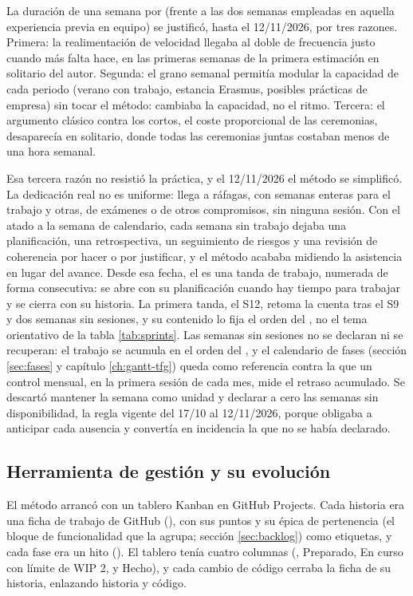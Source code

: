 La duración de una semana por  (frente a las dos semanas empleadas en aquella experiencia previa en equipo) se justificó, hasta el 12/11/2026, por tres razones.
Primera: la realimentación de velocidad llegaba al doble de frecuencia justo cuando más falta hace, en las primeras semanas de la primera estimación en solitario del autor.
Segunda: el grano semanal permitía modular la capacidad de cada periodo (verano con trabajo, estancia Erasmus, posibles prácticas de empresa) sin tocar el método: cambiaba la capacidad, no el ritmo.
Tercera: el argumento clásico contra los  cortos, el coste proporcional de las ceremonias, desaparecía en solitario, donde todas las ceremonias juntas costaban menos de una hora semanal.

Esa tercera razón no resistió la práctica, y el 12/11/2026 el método se simplificó.
La dedicación real no es uniforme: llega a ráfagas, con semanas enteras para el trabajo y otras, de exámenes o de otros compromisos, sin ninguna sesión.
Con el  atado a la semana de calendario, cada semana sin trabajo dejaba una planificación, una retrospectiva, un seguimiento de riesgos y una revisión de coherencia por hacer o por justificar, y el método acababa midiendo la asistencia en lugar del avance.
Desde esa fecha, el  es una tanda de trabajo, numerada de forma consecutiva: se abre con su planificación cuando hay tiempo para trabajar y se cierra con su historia.
La primera tanda, el S12, retoma la cuenta tras el S9 y dos semanas sin sesiones, y su contenido lo fija el orden del , no el tema orientativo de la tabla \ref{tab:sprints}.
Las semanas sin sesiones no se declaran ni se recuperan: el trabajo se acumula en el orden del , y el calendario de fases (sección \ref{sec:fases} y capítulo \ref{ch:gantt-tfg}) queda como referencia contra la que un control mensual, en la primera sesión de cada mes, mide el retraso acumulado.
Se descartó mantener la semana como unidad y declarar a cero las semanas sin disponibilidad, la regla vigente del 17/10 al 12/11/2026, porque obligaba a anticipar cada ausencia y convertía en incidencia la que no se había declarado.

\subsection{Herramienta de gestión y su evolución}
\label{sec:metodologia-herramienta}

El método arrancó con un tablero Kanban en GitHub Projects.
Cada historia era una ficha de trabajo de GitHub (), con sus puntos y su épica de pertenencia (el bloque de funcionalidad que la agrupa; sección \ref{sec:backlog}) como etiquetas, y cada fase era un hito ().
El tablero tenía cuatro columnas (, Preparado, En curso con límite de \acs{WIP} 2, y Hecho), y cada cambio de código cerraba la ficha de su historia, enlazando historia y código.

